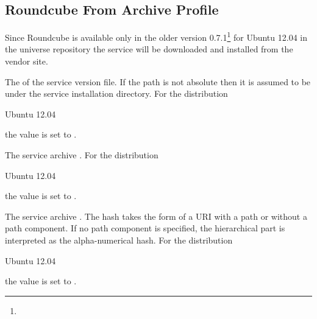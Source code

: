 \label{sec:roundcube_fromarchive_profile}
\subsection{Roundcube From Archive Profile}

Since Roundcube is available only in the older
version 0.7.1\footnote{} for Ubuntu 12.04
in the universe repository the service will be downloaded and installed
from the vendor site.


The  of the service version file. If the path is not absolute
then it is assumed to be under the service installation directory.
For the distribution
\begin{inparaitem}
\item[\TheDistribution{ubuntu}] Ubuntu 12.04
\end{inparaitem}
the value is set to .


The service archive .
For the distribution
\begin{inparaitem}
\item[\TheDistribution{ubuntu}] Ubuntu 12.04
\end{inparaitem}
the value is set to 
.


The service archive . The hash takes the form of a URI with a path
or without a path component. If no path component is specified, the hierarchical part
is interpreted as the alpha-numerical hash.
For the distribution
\begin{inparaitem}
\item[\TheDistribution{ubuntu}] Ubuntu 12.04
\end{inparaitem}
the value is set to .

